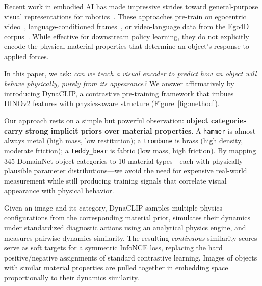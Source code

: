 \documentclass{article}
\newcommand{\methodname}{DynaCLIP}
\begin{document}
Recent work in embodied AI has made impressive strides toward general-purpose visual representations for robotics~\cite{nair2022r3m,ma2022vip,radosavovic2023vc1,karamcheti2023voltron}. These approaches pre-train on egocentric video~\cite{radosavovic2023vc1}, language-conditioned frames~\cite{karamcheti2023voltron}, or video-language data from the Ego4D corpus~\cite{nair2022r3m,ma2022vip}. While effective for downstream policy learning, they do not explicitly encode the physical material properties that determine an object's response to applied forces.

In this paper, we ask: \emph{can we teach a visual encoder to predict how an object will behave physically, purely from its appearance?} We answer affirmatively by introducing \methodname{}, a contrastive pre-training framework that imbues DINOv2 features with physics-aware structure (Figure~\ref{fig:method}).

Our approach rests on a simple but powerful observation: \textbf{object categories carry strong implicit priors over material properties}. A \texttt{hammer} is almost always metal (high mass, low restitution); a \texttt{trombone} is brass (high density, moderate friction); a \texttt{teddy\_bear} is fabric (low mass, high friction). By mapping 345 DomainNet object categories to 10 material types---each with physically plausible parameter distributions---we avoid the need for expensive real-world measurement while still producing training signals that correlate visual appearance with physical behavior.

Given an image and its category, \methodname{} samples multiple physics configurations from the corresponding material prior, simulates their dynamics under standardized diagnostic actions using an analytical physics engine, and measures pairwise dynamics similarity. The resulting \emph{continuous} similarity scores serve as soft targets for a symmetric InfoNCE loss, replacing the hard positive/negative assignments of standard contrastive learning. Images of objects with similar material properties are pulled together in embedding space proportionally to their dynamics similarity.
\end{document}

